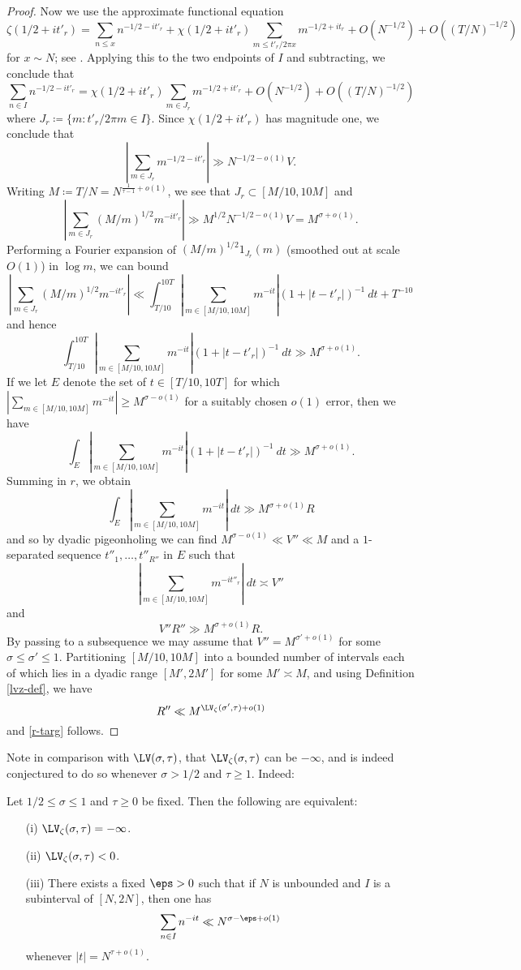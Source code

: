 \begin{proof}
Now we use the approximate functional equation
$$ \zeta(1/2+it'_r) = \sum_{n \leq x} n^{-1/2-it'_r} + \chi(1/2+it'_r) \sum_{m \leq t'_r / 2\pi x} m^{-1/2+it_r} + O(N^{-1/2}) + O((T/N)^{-1/2})$$
for $x \sim N$; see \cite[Theorem 4.1]{ivic}.  Applying this to the two endpoints of $I$ and subtracting, we conclude that
$$ \sum_{n \in I} n^{-1/2-it'_r} =\chi(1/2+it'_r) \sum_{m \in J_r} m^{-1/2+it'_r} + O(N^{-1/2}) + O((T/N)^{-1/2})$$
where $J_r \coloneqq \{ m: t'_r / 2\pi m \in I \}$. Since $\chi(1/2+it'_r)$ has magnitude one, we conclude that
$$ |\sum_{m \in J_r} m^{-1/2-it'_r}| \gg N^{-1/2-o(1)} V.$$
Writing $M \coloneqq T/N = N^{\frac{1}{\tau-1}+o(1)}$, we see that $J_r \subset [M/10, 10M]$ and
$$ |\sum_{m \in J_r} (M/m)^{1/2} m^{-it'_r}| \gg M^{1/2} N^{-1/2-o(1)} V = M^{\sigma+o(1)}.$$
Performing a Fourier expansion of $(M/m)^{1/2} 1_{J_r}(m)$ (smoothed out at scale $O(1)$) in $\log m$, we can bound
$$ |\sum_{m \in J_r} (M/m)^{1/2} m^{-it'_r}| \ll \int_{T/10}^{10T} |\sum_{m \in [M/10,10M]} m^{-it}| (1 + |t-t'_r|)^{-1}\ dt + T^{-10}$$
and hence
$$ \int_{T/10}^{10T} |\sum_{m \in [M/10,10M]} m^{-it}| (1 + |t-t'_r|)^{-1}\ dt  \gg M^{\sigma+o(1)}.$$
If we let $E$ denote the set of $t \in [T/10, 10T]$ for which $|\sum_{m \in [M/10,10M]} m^{-it}| \geq M^{\sigma-o(1)}$ for a suitably chosen $o(1)$ error, then we have
$$ \int_E |\sum_{m \in [M/10,10M]} m^{-it}| (1 + |t-t'_r|)^{-1}\ dt  \gg M^{\sigma+o(1)}.$$
Summing in $r$, we obtain
$$ \int_E |\sum_{m \in [M/10,10M]} m^{-it}|\ dt  \gg M^{\sigma+o(1)} R$$
and so by dyadic pigeonholing we can find $M^{\sigma-o(1)} \ll V'' \ll M$ and a $1$-separated sequence $t''_1,\dots,t''_{R''}$ in $E$ such that
$$ |\sum_{m \in [M/10,10M]} m^{-it''_r}|\ dt \asymp V''$$
and
$$ V'' R'' \gg M^{\sigma+o(1)} R.$$
By passing to a subsequence we may assume that $V'' = M^{\sigma'+o(1)}$ for some $\sigma \leq \sigma' \leq 1$. Partitioning $[M/10,10M]$ into a bounded number of intervals each of which lies in a dyadic range $[M',2M']$ for some $M' \asymp M$, and using Definition \ref{lvz-def}, we have
$$ R''  \ll M^{\LV_\zeta(\sigma',\tau)+o(1)}$$
and \eqref{r-targ} follows.
\end{proof}

Note in comparison with $\LV(\sigma,\tau)$, that $\LV_\zeta(\sigma,\tau)$ can be $-\infty$, and is indeed conjectured to do so whenever $\sigma>1/2$ and $\tau \geq 1$. Indeed:

\begin{lemma}\label{lvz-infty}  Let $1/2 \leq \sigma \leq 1$ and $\tau \geq 0$ be fixed. Then the following are equivalent:
\begin{itemize}
\item[(i)] $\LV_\zeta(\sigma,\tau)=-\infty$.
\item[(ii)] $\LV_\zeta(\sigma,\tau) < 0$.
\item[(iii)] There exists a fixed $\eps>0$ such that if $N$ is unbounded and $I$ is a subinterval of $[N, 2N]$, then one has
$$ \sum_{n \in I} n^{-it} \ll N^{\sigma-\eps+o(1)}$$
whenever $|t| = N^{\tau+o(1)}$.
\end{itemize}
\end{lemma}


